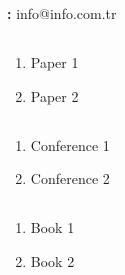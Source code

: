 \chapter*{\cvpub}

\hfill \textbf{\cvcontact:} info@info.com.tr

\section*{\cvpapers}
\begin{enumerate}
\item Paper 1
\item Paper 2
\end{enumerate}


\section*{\cvconf}
\begin{enumerate}
\item Conference 1
\item Conference 2
\end{enumerate}


\section*{\cvbooks}
\begin{enumerate}
\item Book 1
\item Book 2
\end{enumerate}


